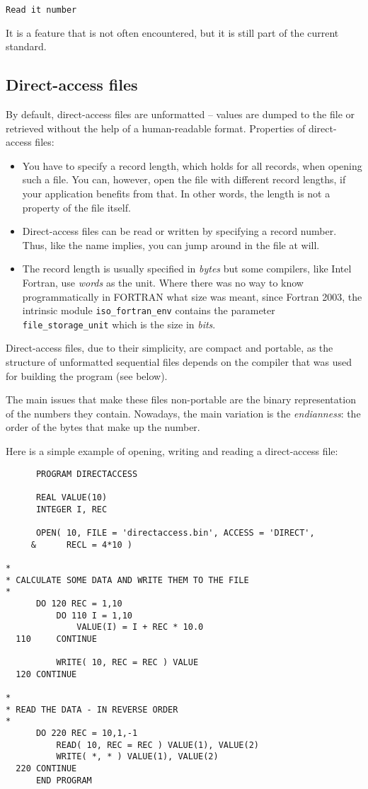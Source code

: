 \begin{verbatim}
Read it number
\end{verbatim}

It is a feature that is not often encountered, but it is still part of the current standard.


\subsection{Direct-access files}
By default, direct-access files are unformatted -- values are dumped to the file or retrieved
without the help of a human-readable format. Properties of direct-access files:
\begin{itemize}
\item
You have to specify a record length, which holds for all records, when opening such a file.
You can, however, open the file with different record lengths, if your application benefits
from that. In other words, the length is not a property of the file itself.
\item
Direct-access files can be read or written by specifying a record number. Thus, like the name
implies, you can jump around in the file at will.
\item
The record length is usually specified in \emph{bytes} but some compilers, like Intel Fortran,
use \emph{words} as the unit. Where there was no way to know programmatically in FORTRAN what
size was meant, since Fortran 2003, the intrinsic module \verb+iso_fortran_env+ contains the parameter \verb+file_storage_unit+
which is the size in \emph{bits}.
\end{itemize}

Direct-access files, due to their simplicity, are compact and portable, as the structure of
unformatted sequential files depends on the compiler that was used for building the program (see below).

The main issues that make these files non-portable are the binary representation of the
numbers they contain. Nowadays, the main variation is the \emph{endianness}: the order of the
bytes that make up the number.

Here is a simple example of opening, writing and reading a direct-access file:

\begin{verbatim}
      PROGRAM DIRECTACCESS

      REAL VALUE(10)
      INTEGER I, REC

      OPEN( 10, FILE = 'directaccess.bin', ACCESS = 'DIRECT',
     &      RECL = 4*10 )

*
* CALCULATE SOME DATA AND WRITE THEM TO THE FILE
*
      DO 120 REC = 1,10
          DO 110 I = 1,10
              VALUE(I) = I + REC * 10.0
  110     CONTINUE

          WRITE( 10, REC = REC ) VALUE
  120 CONTINUE

*
* READ THE DATA - IN REVERSE ORDER
*
      DO 220 REC = 10,1,-1
          READ( 10, REC = REC ) VALUE(1), VALUE(2)
          WRITE( *, * ) VALUE(1), VALUE(2)
  220 CONTINUE
      END PROGRAM
\end{verbatim}

